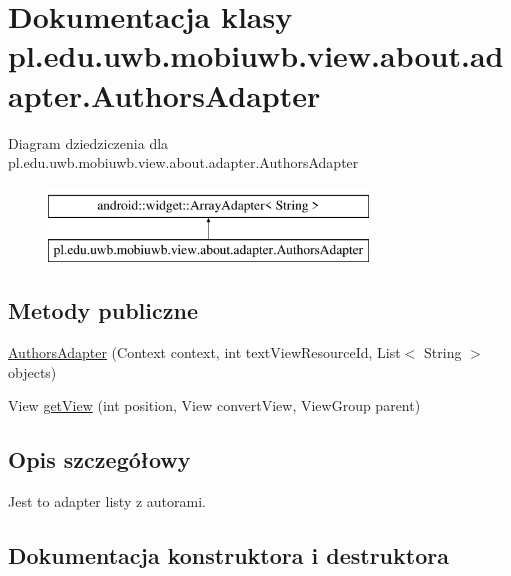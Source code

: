 \hypertarget{classpl_1_1edu_1_1uwb_1_1mobiuwb_1_1view_1_1about_1_1adapter_1_1_authors_adapter}{}\section{Dokumentacja klasy pl.\+edu.\+uwb.\+mobiuwb.\+view.\+about.\+adapter.\+Authors\+Adapter}
\label{classpl_1_1edu_1_1uwb_1_1mobiuwb_1_1view_1_1about_1_1adapter_1_1_authors_adapter}
Diagram dziedziczenia dla pl.\+edu.\+uwb.\+mobiuwb.\+view.\+about.\+adapter.\+Authors\+Adapter\begin{figure}[H]
\begin{center}
\leavevmode
\includegraphics[height=2.000000cm]{classpl_1_1edu_1_1uwb_1_1mobiuwb_1_1view_1_1about_1_1adapter_1_1_authors_adapter}
\end{center}
\end{figure}
\subsection*{Metody publiczne}
\begin{DoxyCompactItemize}
\item 
\hyperlink{classpl_1_1edu_1_1uwb_1_1mobiuwb_1_1view_1_1about_1_1adapter_1_1_authors_adapter_ad6e702285de8216bf31b360870fcd77b}{Authors\+Adapter} (Context context, int text\+View\+Resource\+Id, List$<$ String $>$ objects)
\item 
View \hyperlink{classpl_1_1edu_1_1uwb_1_1mobiuwb_1_1view_1_1about_1_1adapter_1_1_authors_adapter_a570957390bc63cfeccbe084dec1826f1}{get\+View} (int position, View convert\+View, View\+Group parent)
\end{DoxyCompactItemize}


\subsection{Opis szczegółowy}
Jest to adapter listy z autorami. 

\subsection{Dokumentacja konstruktora i destruktora}
\hypertarget{classpl_1_1edu_1_1uwb_1_1mobiuwb_1_1view_1_1about_1_1adapter_1_1_authors_adapter_ad6e702285de8216bf31b360870fcd77b}{}
